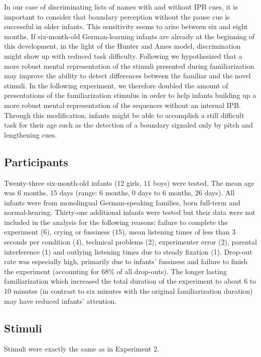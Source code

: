 \documentclass[output=paper]{langscibook}
\begin{document}
In our case of discriminating lists of names with and without IPB cues, it is important to consider that boundary perception without the pause cue is successful in older infants. This sensitivity seems to arise between six and eight months. If six-month-old German-learning infants are already at the beginning of this development, in the light of the Hunter and Ames model, discrimination might show up with reduced task difficulty. Following \citet{Bijeljac-Babic2012} we hypothesized that a more robust mental representation of the stimuli presented during familiarization may improve the ability to detect differences between the familiar and the novel stimuli. In the following experiment, we therefore doubled the amount of presentations of the familiarization stimulus in order to help infants building up a more robust mental representation of the sequences without an internal IPB. Through this modification, infants might be able to accomplish a still difficult task for their age such as the detection of a boundary signaled only by pitch and lengthening cues.\largerpage[2]

\subsection{Participants}
Twenty-three six-month-old infants (12 girls, 11 boys) were tested. The mean age was 6 months, 15 days (range: 6 months, 0 days to 6 months, 26 days). All infants were from monolingual German-speaking families, born full-term and normal-hearing. Thirty-one additional infants were tested but their data were not included in the analysis for the following reasons: failure to complete the experiment (6), crying or fussiness (15), mean listening times of less than 3 seconds per condition (4), technical problems (2), experimenter error (2), parental interference (1) and outlying listening times due to steady fixation (1).
Drop-out rate was especially high, primarily due to infants’ fussiness and failure to finish the experiment (accounting for 68\% of all drop-outs). The longer lasting familiarization which increased the total duration of the experiment to about 6 to 10 minutes (in contrast to six minutes with the original familiarization duration) may have reduced infants’ attention.

\subsection{Stimuli}
Stimuli were exactly the same as in Experiment 2.
\end{document}
